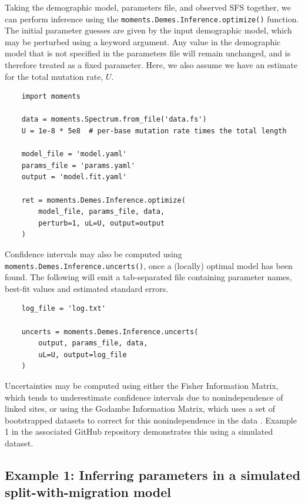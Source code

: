 \documentclass[]{article}
\begin{document}
Taking the demographic model, parameters file, and observed SFS together, we
can perform inference using the \texttt{moments.Demes.Inference.optimize()}
function. The initial parameter guesses are given by the input demographic
model, which may be perturbed using a keyword argument. Any value in the
demographic model that is not specified in the parameters file will remain
unchanged, and is therefore treated as a fixed parameter. Here, we also assume
we have an estimate for the total mutation rate, $U$.
\begin{verbatim}
    import moments 

    data = moments.Spectrum.from_file('data.fs')
    U = 1e-8 * 5e8  # per-base mutation rate times the total length

    model_file = 'model.yaml'
    params_file = 'params.yaml'
    output = 'model.fit.yaml'

    ret = moments.Demes.Inference.optimize(
        model_file, params_file, data,
        perturb=1, uL=U, output=output
    )
\end{verbatim}

Confidence intervals may also be computed using
\texttt{moments.Demes.Inference.uncerts()}, once a (locally) optimal model has
been found. The following will emit a tab-separated file containing parameter
names, best-fit values and estimated standard errors.
\begin{verbatim}
    log_file = 'log.txt'

    uncerts = moments.Demes.Inference.uncerts(
        output, params_file, data,
        uL=U, output=log_file
    )
\end{verbatim}
Uncertainties may be computed using either the Fisher Information Matrix, which
tends to underestimate confidence intervals due to nonindependence of linked
sites, or using the Godambe Information Matrix, which uses a set of
bootstrapped datasets to correct for this nonindependence in the data
\citep{coffman2016computationally}. Example 1 in the associated GitHub
repository demonstrates this using a simulated dataset.

\subsection*{Example 1: Inferring parameters in a simulated split-with-migration model}
\end{document}
